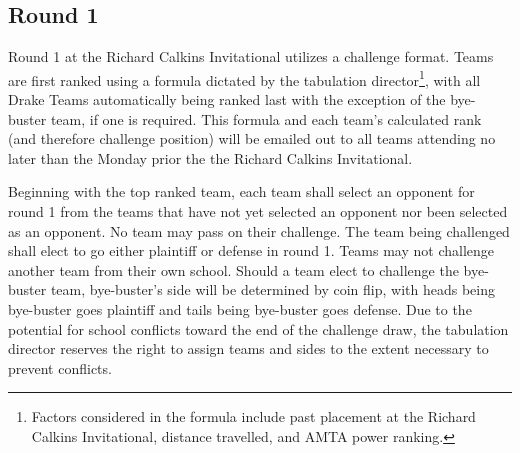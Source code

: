 \documentclass{article}
\begin{document}
\subsection{Round 1}
Round 1 at the Richard Calkins Invitational utilizes a challenge format.  Teams are first ranked using a formula dictated by the tabulation director\footnote{Factors considered in the formula include past placement at the Richard Calkins Invitational, distance travelled, and AMTA power ranking.}, with all Drake Teams automatically being ranked last with the exception of the bye-buster team, if one is required.  This formula and each team's calculated rank (and therefore challenge position) will be emailed out to all teams attending no later than the Monday prior the the Richard Calkins Invitational.

Beginning with the top ranked team, each team shall select an opponent for round 1 from the teams that have not yet selected an opponent nor been selected as an opponent.  No team may pass on their challenge.  The team being challenged shall elect to go either plaintiff or defense in round 1.  Teams may not challenge another team from their own school.  Should a team elect to challenge the bye-buster team, bye-buster's side will be determined by coin flip, with heads being bye-buster goes plaintiff and tails being bye-buster goes defense.  Due to the potential for school conflicts toward the end of the challenge draw, the tabulation director reserves the right to assign teams and sides to the extent necessary to prevent conflicts.
\end{document}
